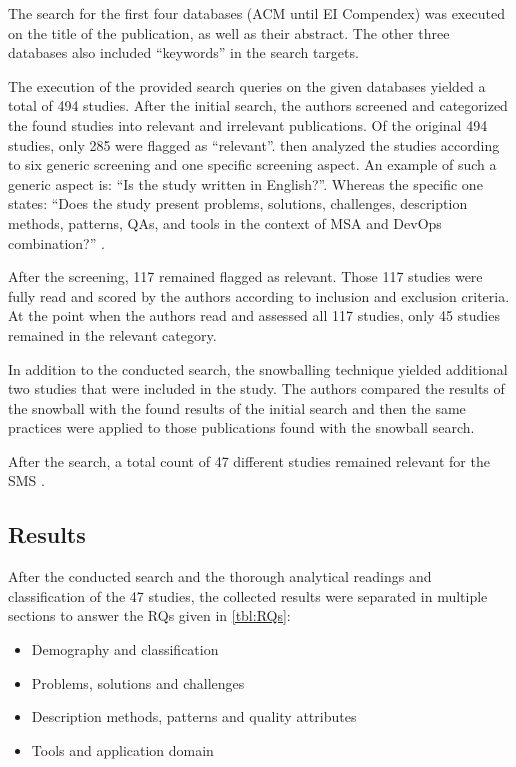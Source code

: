 The search for the first four databases (ACM until EI Compendex) was executed
on the title of the publication, as well as their abstract. The other three
databases also included ``keywords'' in the search targets.

The execution of the provided search queries on the given databases
yielded a total of 494 studies. After the initial search, the authors
screened and categorized the found studies into relevant and irrelevant
publications. Of the original 494 studies, only 285 were flagged as ``relevant''.
\smsAuthors then analyzed the studies according to six generic screening and one specific
screening aspect. An example of such a generic aspect is: ``Is the study written in English?''.
Whereas the specific one states: ``Does the study present problems, solutions, challenges,
description methods, patterns, QAs, and tools in the context of
MSA and DevOps combination?'' \cite{waseem:SMSMSADevOps}.

After the screening, 117 remained flagged as relevant.
Those 117 studies were fully read and scored by the authors according to inclusion and
exclusion criteria. At the point when the authors read and assessed all 117 studies,
only 45 studies remained in the relevant category.

In addition to the conducted search, the snowballing technique
yielded additional two studies that were included in the study.
The authors compared the results of the snowball with the found results of the
initial search and then the same practices were applied to those
publications found with the snowball search.

After the search, a total count of 47 different studies remained
relevant for the SMS \cite{waseem:SMSMSADevOps}.

\subsection{Results}

After the conducted search and the thorough analytical readings and classification
of the 47 studies, the collected results were separated in multiple sections
to answer the RQs given in \autoref{tbl:RQs}:

\begin{itemize}
    \item Demography and classification
    \item Problems, solutions and challenges
    \item Description methods, patterns and quality attributes
    \item Tools and application domain
\end{itemize}

